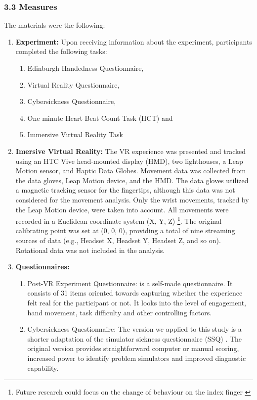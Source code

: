 \documentclass[12pt,oneside,openright]{report}
\begin{document}
\subsubsection*{3.3 Measures}
The materials were the following:
  \begin{enumerate}
    \item[3.3.1] \textbf{Experiment:} Upon receiving information about the experiment, participants completed the following tasks:
    \begin{enumerate}
      \item[(i)] Edinburgh Handedness Questionnaire,
      \item[(ii)] Virtual Reality Questionnaire,
      \item[(iii)] Cybersickness Questionnaire,
      \item[(iv)] One minute Heart Beat Count Task (HCT)  and
      \item[(v)] Immersive Virtual Reality Task   
    \end{enumerate}
    
    \item[3.3.2] \textbf{Imersive Virtual Reality:} The VR experience was presented and tracked using an HTC Vive head-mounted display (HMD), two lighthouses, a Leap Motion sensor, and Haptic Data Globes. Movement data was collected from the data gloves, Leap Motion device, and the HMD. The data gloves utilized a magnetic tracking sensor for the fingertips, although this data was not considered for the movement analysis. Only the wrist movements, tracked by the Leap Motion device, were taken into account. All movements were recorded in a Euclidean coordinate system (X, Y, Z) \footnote{Future research could focus on the change of behaviour on the index finger \cite{Shao2016}}. The original calibrating point was set at (0, 0, 0), providing a total of nine streaming sources of data (e.g., Headset X, Headset Y, Headset Z, and so on). Rotational data was not included in the analysis.



    \item[3.3.4] \textbf{Questionnaires:}
      \begin{enumerate}
        \item[(i)] Post-VR Experiment Questionnaire: is a self-made questionnaire. It consists of 31 items oriented towards capturing whether the experience felt real for the participant or not. It looks into the level of engagement, hand movement, task difficulty and other controlling factors. 
        \item[(ii)] Cybersickness Questionnaire: The version we applied to this study is a shorter adaptation of the simulator sickness questionnaire (SSQ) \cite*{SSQ93}. The original version provides straightforward computer or manual scoring, increased power to identify problem simulators and improved diagnostic capability.
    \end{enumerate}
  \end{enumerate}
\end{document}

